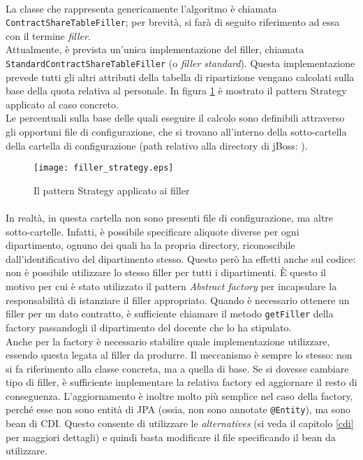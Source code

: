 \paragraph{}
La classe che rappresenta genericamente l'algoritmo è chiamata \lstinline{ContractShareTableFiller}; per brevità, si farà di seguito riferimento ad essa con il termine \textsl{filler}. \\
Attualmente, è prevista un'unica implementazione del filler, chiamata \lstinline{StandardContractShareTableFiller} (o \textsl{filler standard}). Questa implementazione prevede tutti gli altri attributi della tabella di ripartizione vengano calcolati sulla base della quota relativa al personale. In figura \ref{filler_strategy} è mostrato il pattern Strategy applicato al caso concreto.\\
Le percentuali sulla base delle quali eseguire il calcolo sono definibili attraverso gli opportuni file di configurazione, che si trovano all'interno della sotto-cartella  della cartella di configurazione (path relativo alla directory di jBoss: ). \\

\begin{figure}[h]
\centering
\texttt{[image: filler\_strategy.eps]}
\caption{Il pattern Strategy applicato ai filler}
\label{filler_strategy}
\end{figure}

\paragraph{}
In realtà, in questa cartella non sono presenti file di configurazione, ma altre sotto-cartelle. Infatti, è possibile specificare aliquote diverse per ogni dipartimento, ognuno dei quali ha la propria directory, riconoscibile dall'identificativo del dipartimento stesso. Questo però ha effetti anche sul codice: non è possibile utilizzare lo stesso filler per tutti i dipartimenti. È questo il motivo per cui è stato utilizzato il pattern \textsl{Abstract factory} per incapsulare la responsabilità di istanziare il filler appropriato. Quando è necessario ottenere un filler per un dato contratto, è sufficiente chiamare il metodo \lstinline{getFiller} della factory passandogli il dipartimento del docente che lo ha stipulato. \\
Anche per la factory è necessario stabilire quale implementazione utilizzare, essendo questa legata al filler da produrre. Il meccanismo è sempre lo stesso: non si fa riferimento alla classe concreta, ma a quella di base. Se si dovesse cambiare tipo di filler, è sufficiente implementare la relativa factory ed aggiornare il resto di conseguenza. L'aggiornamento è inoltre molto più semplice nel caso della factory, perché esse non sono entità di JPA (ossia, non sono annotate \lstinline{@Entity}), ma sono bean di CDI. Questo consente di utilizzare le \textit{alternatives} (si veda il capitolo \ref{cdi} per maggiori dettagli) e quindi basta modificare il file  specificando il bean da utilizzare.\\

